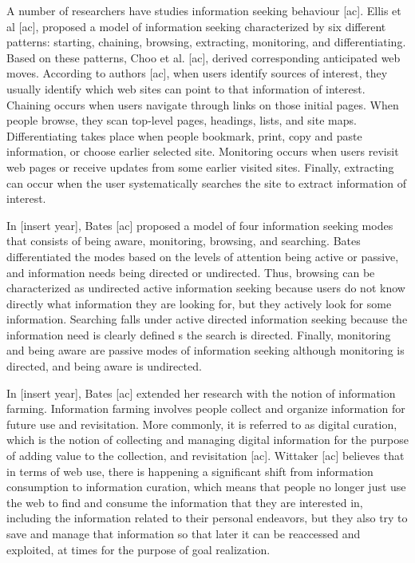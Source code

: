 \documentclass{casconpaper}
\begin{document}
{A number of researchers have studies information seeking behaviour [ac]. Ellis et al [ac], proposed a model of information seeking characterized by six different patterns: starting, chaining, browsing, extracting, monitoring, and differentiating. Based on these patterns, Choo et al. [ac], derived corresponding anticipated web moves. According to authors [ac], when users identify sources of interest, they usually identify which web sites can point to that information of interest.  Chaining occurs when users navigate through links on those initial pages. When people browse, they scan top-level pages, headings, lists, and site maps. Differentiating takes place when people bookmark, print, copy and paste information, or choose earlier selected site. Monitoring occurs when users revisit web pages or receive updates from some earlier visited sites. Finally, extracting can occur when the user systematically searches the site to extract information of interest. 

In [insert year], Bates [ac] proposed a model of four information seeking modes that consists of being aware, monitoring, browsing, and searching. Bates differentiated the modes based on the levels of attention being active or passive, and information needs being directed or undirected. Thus, browsing can be characterized as undirected active information seeking because users do not know directly what information they are looking for, but they actively look for some information. Searching falls under active directed information seeking because the information need is clearly defined s the search is directed. Finally, monitoring and being aware are passive modes of information seeking although monitoring is directed, and being aware is undirected.   

In [insert year], Bates [ac] extended her research with the notion of information farming. Information farming involves people collect and organize information for future use and revisitation. More commonly, it is referred to as digital curation, which is the notion of collecting and managing digital information for the purpose of adding value to the collection, and revisitation [ac]. Wittaker [ac] believes that in terms of web use, there is happening a significant shift from information consumption to information curation, which means that people no longer just use the web to find and consume the information that they are interested in, including the information related to their personal endeavors, but they also try to save and manage that information so that later it can be reaccessed and exploited, at times for the purpose of goal realization. 

}
\end{document}

